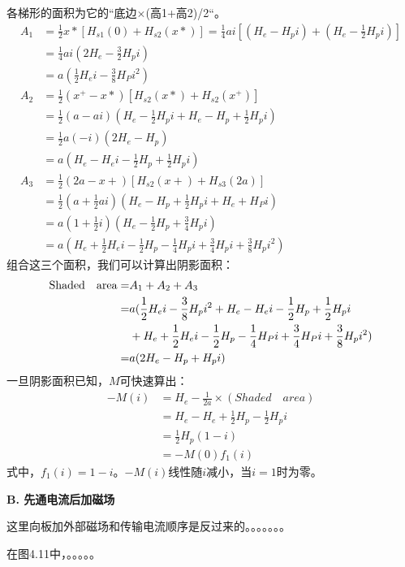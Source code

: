 各梯形的面积为它的``底边$\times$(高1+高2)/2``。
\begin{align*}%
A_{1}&=\frac{1}{2}x*[H_{s1}(0)+H_{s2}(x*)]=\frac{1}{4}ai[(H_{e}-H_{p}i)+(H_{e}-\frac{1}{2}H_{p}i)]\\
&=\frac{1}{4}ai(2H_{e}-\frac{3}{2}H_{p}i)  \\
&=a(\frac{1}{2}H_{e}i-\frac{3}{8}H_{P}i^{2})\\
A_{2}&=\frac{1}{2}(x^{+}-x*)[H_{s2}(x*)+H_{s2}(x^{+})]\\
&=\frac{1}{2}(a-ai)(H_{e}-\frac{1}{2}H_{p}i+H_{e}-H_{p}+\frac{1}{2}H_{p}i)\\
&=\frac{1}{2}a(-i)(2H_{e}-H_{p})\\
&=a(H_{e}-H_{e}i-\frac{1}{2}H_{p}+\frac{1}{2}H_{p}i)\\
A_{3}&=\frac{1}{2}(2a-x+)[H_{s2}(x+)+H_{s3}(2a)]\\
&=\frac{1}{2}(a+\frac{1}{2}ai)(H_{e}-H_{p}+\frac{1}{2}H_{p}i+H_{e}+H_{P}i)\\
&=a(1+\frac{1}{2}i)(H_{e}-\frac{1}{2}H_{p}+\frac{3}{4}H_{p}i)\\
&=a(H_{e}+\frac{1}{2}H_{e}i-\frac{1}{2}H_{p}-\frac{1}{4}H_{p}i+\frac{3}{4}H_{p}i+\frac{3}{8}H_{p}i^{2})
\end{align*}
组合这三个面积，我们可以计算出阴影面积：
\begin{align*}%
\text{Shaded\quad area}=&A_{1}+A_{2}+A_{3}\\
=&a(\frac{1}{2}H_{e}i-\frac{3}{8}H_{p}i^{2}+H_{e}-H_{e}i-\frac{1}{2}H_{p}+\frac{1}{2}H_{p}i\\
&+H_{e}+\frac{1}{2}H_{e}i-\frac{1}{2}H_{p}-\frac{1}{4}H_{P}i+\frac{3}{4}H_{P}i+\frac{3}{8}H_{p}i^{2})\\
=&a(2H_{e}-H_{p}+H_{p}i)
\end{align*}
一旦阴影面积已知，$M$可快速算出：
\begin{align*}%
-M(i)&=H_{e}-\frac{1}{2a}\times(Shaded\quad area)\\
&=H_{e}-H_{e}+\frac{1}{2}H_{p}-\frac{1}{2}H_{p}i\\
&=\frac{1}{2}H_{p}(1-i)\\
&=-M(0)f_{1}(i)
\end{align*}
式中，$f_1(i) = 1 − i$。$−M(i)$线性随$i$减小，当$i=1$时为零。 

\textbf{B. 先通电流后加磁场}

这里向板加外部磁场和传输电流顺序是反过来的。。。。。。。

在图4.11中，。。。。。

